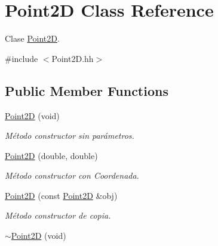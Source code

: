 \hypertarget{class_point2_d}{\section{Point2\-D Class Reference}
\label{class_point2_d}
}


Clase \hyperlink{class_point2_d}{Point2\-D}.  




{\ttfamily \#include $<$Point2\-D.\-hh$>$}

\subsection*{Public Member Functions}
\begin{DoxyCompactItemize}
\item 
\hyperlink{class_point2_d_a1b119032e0b60ef27f8610d640e241e2}{Point2\-D} (void)
\begin{DoxyCompactList}\small\item\em Método constructor sin parámetros. \end{DoxyCompactList}\item 
\hyperlink{class_point2_d_a0e3ee506aac9ae6461bdf6083c7596b0}{Point2\-D} (double, double)
\begin{DoxyCompactList}\small\item\em Método constructor con Coordenada. \end{DoxyCompactList}\item 
\hyperlink{class_point2_d_aee8bdb479f01aaea16059b9d7a6e3fe4}{Point2\-D} (const \hyperlink{class_point2_d}{Point2\-D} \&obj)
\begin{DoxyCompactList}\small\item\em Método constructor de copia. \end{DoxyCompactList}\item 
\hypertarget{class_point2_d_ada35e16f1d98a3be260ebb4baeba538b}{\hyperlink{class_point2_d_ada35e16f1d98a3be260ebb4baeba538b}{$\sim$\-Point2\-D} (void)}\label{class_point2_d_ada35e16f1d98a3be260ebb4baeba538b}


\end{DoxyCompactItemize}
